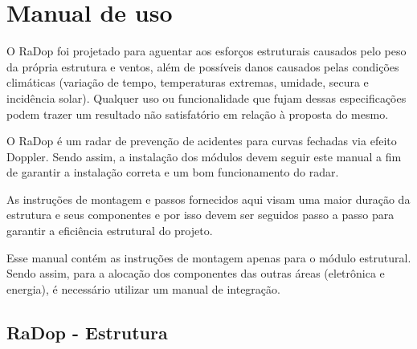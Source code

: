 
\chapter{Manual de uso}

        
        
         O RaDop foi projetado para aguentar aos esforços estruturais causados pelo peso da própria estrutura e ventos, além de possíveis danos causados pelas condições climáticas (variação de tempo, temperaturas extremas, umidade, secura e incidência solar). Qualquer uso ou funcionalidade que fujam dessas especificações podem trazer um resultado não satisfatório em relação à proposta do mesmo. 
    
        O RaDop é um radar de prevenção de acidentes para curvas fechadas via efeito Doppler. Sendo assim, a instalação dos módulos devem seguir este manual a fim de garantir a instalação correta e um bom funcionamento do radar. 
        
        As instruções de montagem e passos fornecidos aqui visam uma maior duração da estrutura e seus componentes e por isso devem ser seguidos passo a passo para garantir a eficiência estrutural do projeto.
        
        Esse manual contém as instruções de montagem apenas para o módulo estrutural. Sendo assim, para a alocação dos componentes das outras áreas (eletrônica e energia), é necessário utilizar um manual de integração.
        
        
        
        \section{RaDop - Estrutura}
        
